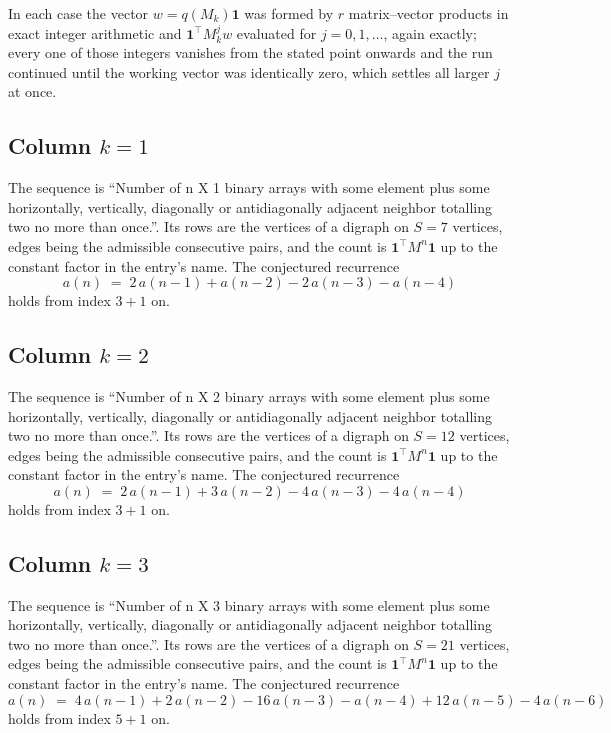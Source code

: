 \documentclass[11pt,a4paper]{article}
\theoremstyle{plain}
\theoremstyle{definition}
\begin{document}
In each case the vector $w=q(M_k)\mathbf{1}$ was formed by $r$ matrix--vector products in
exact integer arithmetic and $\mathbf{1}^{\!\top}M_k^{j}w$ evaluated for $j=0,1,\dots$,
again exactly; every one of those integers vanishes from the stated point onwards and the run
continued until the working vector was identically zero, which settles all larger $j$ at once.

\subsection*{Column $k$$=1$}
The sequence is ``Number of n X 1 binary arrays with some element plus some horizontally, vertically, diagonally or antidiagonally adjacent neighbor totalling two no more than once.''. Its rows are the vertices of a digraph on
$S=7$ vertices, edges being the admissible consecutive pairs, and the count is
$\mathbf{1}^{\!\top}M^{n}\mathbf{1}$ up to the constant factor in the entry's name.
The conjectured recurrence
\[
a(n)\;=\;2\,a(n-1) + a(n-2) - 2\,a(n-3) - a(n-4)
\]
holds from index $3+1$ on.

\subsection*{Column $k$$=2$}
The sequence is ``Number of n X 2 binary arrays with some element plus some horizontally, vertically, diagonally or antidiagonally adjacent neighbor totalling two no more than once.''. Its rows are the vertices of a digraph on
$S=12$ vertices, edges being the admissible consecutive pairs, and the count is
$\mathbf{1}^{\!\top}M^{n}\mathbf{1}$ up to the constant factor in the entry's name.
The conjectured recurrence
\[
a(n)\;=\;2\,a(n-1) + 3\,a(n-2) - 4\,a(n-3) - 4\,a(n-4)
\]
holds from index $3+1$ on.

\subsection*{Column $k$$=3$}
The sequence is ``Number of n X 3 binary arrays with some element plus some horizontally, vertically, diagonally or antidiagonally adjacent neighbor totalling two no more than once.''. Its rows are the vertices of a digraph on
$S=21$ vertices, edges being the admissible consecutive pairs, and the count is
$\mathbf{1}^{\!\top}M^{n}\mathbf{1}$ up to the constant factor in the entry's name.
The conjectured recurrence
\[
a(n)\;=\;4\,a(n-1) + 2\,a(n-2) - 16\,a(n-3) - a(n-4) + 12\,a(n-5) - 4\,a(n-6)
\]
holds from index $5+1$ on.
\end{document}
